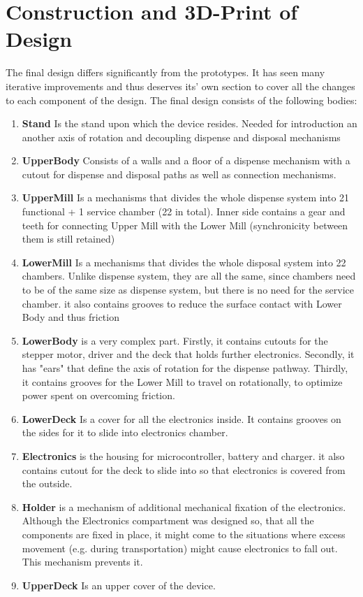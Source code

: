 \section{Construction and 3D-Print of Design}\label{sec:3DPrint}
The final design differs significantly from the prototypes. It has seen many iterative improvements and thus deserves its' own section to cover all the changes to each component of the design. The final design consists of the following bodies:
\begin{enumerate}
	\item{\textbf{Stand}} Is the stand upon which the device resides. Needed for introduction an another axis of rotation and decoupling dispense and disposal mechanisms
	\item{\textbf{UpperBody}} Consists of a walls and a floor of a dispense mechanism with a cutout for dispense and disposal paths as well as connection mechanisms.
	\item{\textbf{UpperMill}} Is a mechanisms that divides the whole dispense system into 21 functional + 1 service chamber (22 in total). Inner side contains a gear and teeth for connecting Upper Mill with the Lower Mill (synchronicity between them is still retained)
	\item{\textbf{LowerMill}} Is a mechanisms that divides the whole disposal system into 22 chambers. Unlike dispense system, they are all the same, since chambers need to be of the same size as dispense system, but there is no need for the service chamber. it also contains grooves to reduce the surface contact with Lower Body and thus friction
	\item{\textbf{LowerBody}} is a very complex part. Firstly, it contains cutouts for the stepper motor, driver and the deck that holds further electronics. Secondly, it has "ears" that define the axis of rotation for the dispense pathway. Thirdly, it contains grooves for the Lower Mill to travel on rotationally, to optimize power spent on overcoming friction.
	\item{\textbf{LowerDeck}} Is a cover for all the electronics inside. It contains grooves on the sides for it to slide into electronics chamber.
	\item{\textbf{Electronics}} is the housing for microcontroller, battery and charger. it also contains cutout for the deck to slide into so that electronics is covered from the outside.
	\item{\textbf{Holder}} is a mechanism of additional mechanical fixation of the electronics. Although the Electronics compartment was designed so, that all the components are fixed in place, it might come to the situations where excess movement (e.g. during transportation) might cause electronics to fall out. This mechanism prevents it.
	\item{\textbf{UpperDeck}} Is an upper cover of the device.
\end{enumerate}

